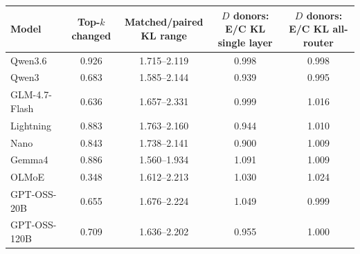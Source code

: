 \begingroup
\fontsize{9}{10.5}\selectfont
\setlength{\tabcolsep}{3pt}
\renewcommand{\arraystretch}{1.08}
\begin{tabular*}{\linewidth}{@{\extracolsep{\fill}}lcccc@{}}
\toprule
Model & \shortstack{Top-$k$\\changed} & \shortstack{Matched/paired\\KL range} & \shortstack{$D$ donors: E/C KL\\single layer} & \shortstack{$D$ donors: E/C KL\\all-router} \\
\midrule
Qwen3.6 & 0.926 & 1.715--2.119 & 0.998 & 0.998 \\[2pt]
Qwen3 & 0.683 & 1.585--2.144 & 0.939 & 0.995 \\[2pt]
GLM-4.7-Flash & 0.636 & 1.657--2.331 & 0.999 & 1.016 \\[2pt]
Lightning & 0.883 & 1.763--2.160 & 0.944 & 1.010 \\[2pt]
Nano & 0.843 & 1.738--2.141 & 0.900 & 1.009 \\[2pt]
Gemma4 & 0.886 & 1.560--1.934 & 1.091 & 1.009 \\[2pt]
OLMoE & 0.348 & 1.612--2.213 & 1.030 & 1.024 \\[2pt]
GPT-OSS-20B & 0.655 & 1.676--2.224 & 1.049 & 0.999 \\[2pt]
GPT-OSS-120B & 0.709 & 1.636--2.202 & 0.955 & 1.000 \\[2pt]
\bottomrule
\end{tabular*}
\endgroup

